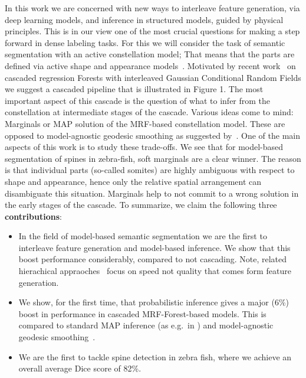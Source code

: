\documentclass[10pt,twocolumn,letterpaper]{article}
\begin{document}
In this work we are concerned with new ways to interleave feature generation, via deep learning models, and inference in structured models, guided by physical principles. This is in our view one of the most crucial questions for making a step forward in dense labeling tasks. For this we will consider the task of semantic segmentation with an active constellation model; That means that the parts are defined via active shape and appearance models~\cite{CootesAAM2001}. Motivated by recent work~\cite{UweCVPR2013} on cascaded regression Forests with interleaved Gaussian Conditional Random Fields we suggest a cascaded pipeline that is illustrated in Figure 1. The most important aspect of this cascade is the question of what to infer from the constellation at intermediate stages of the cascade. Various ideas come to mind: Marginals or MAP solution of the MRF-based constellation model. These are opposed to model-agnostic geodesic smoothing as suggested by~\cite{GeoForests2013}. One of the main aspects of this work is to study these trade-offs. We see that for model-based segmentation of spines in zebra-fish, soft marginals are a clear winner. The reason is that individual parts (so-called somites) are highly ambiguous with respect to shape and appearance, hence only the relative spatial arrangement can disambiguate this situation. Marginals help to not commit to a wrong solution in the early stages of the cascade.
To summarize, we claim the following three {\bf contributions}:
\begin{itemize}
\item In the field of model-based semantic segmentation we are the first to interleave feature generation and model-based inference. We show that this boost performance considerably, compared to not cascading. Note, related hierachical appraoches~\cite{CootesECCV2012RRFandSSM,CootesFemurTMI2013} focus on speed not quality that comes form feature generation. 
\item We show, for the first time, that probabilistic inference gives a major (6\%) boost in performance in cascaded MRF-Forest-based models. This is compared to standard MAP inference (as e.g.\ in \cite{Glocker2013,SeifertAnatomicalSPIE2009,TeethMICCAI2012}) and model-agnostic geodesic smoothing~\cite{GeoForests2013}. 
\item We are the first to tackle spine detection in zebra fish, where we achieve an overall average Dice score of 82\%.
\end{itemize}
\end{document}
